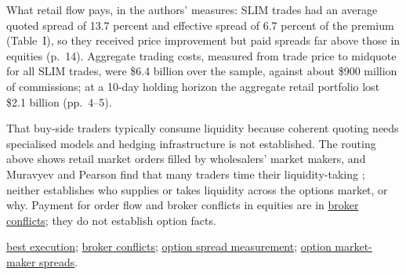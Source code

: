 \begin{qfmechanism}
 What retail flow pays, in the authors' measures: SLIM trades had an average quoted spread of 13.7 percent and effective spread of 6.7 percent of the premium (Table~I), so they received price improvement but paid spreads far above those in equities (p.~14). Aggregate trading costs, measured from trade price to midquote for all SLIM trades, were \$6.4 billion over the sample, against about \$900 million of commissions; at a 10-day holding horizon the aggregate retail portfolio lost \$2.1 billion (pp.~4--5).

 That buy-side traders typically consume liquidity because coherent quoting needs specialised models and hedging infrastructure is not established. The routing above shows retail market orders filled by wholesalers' market makers, and Muravyev and Pearson find that many traders time their liquidity-taking \citep[abstract]{wide-muravyev-pearson}; neither establishes who supplies or takes liquidity across the options market, or why. Payment for order flow and broker conflicts in equities are in \hyperref[def:broker-agency-conflicts]{broker conflicts}; they do not establish option facts.

 \hyperref[def:best-execution]{best execution}; \hyperref[def:broker-agency-conflicts]{broker conflicts}; \hyperref[meth:option-spread-measurement]{option spread measurement}; \hyperref[res:option-market-maker-spreads]{option market-maker spreads}.

\end{qfmechanism}
